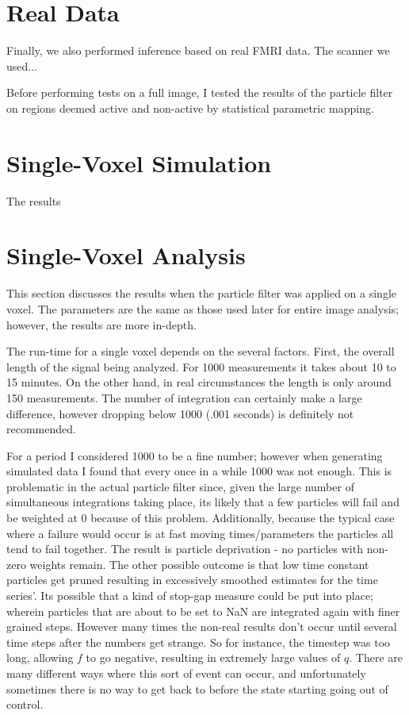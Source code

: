 \section{Real Data}
Finally, we also performed inference based on real FMRI data. The scanner we used...

Before performing tests on a full image, I tested the results of the particle filter
on regions deemed active and non-active by statistical parametric mapping. 
\section{Single-Voxel Simulation}
The results 

\section{Single-Voxel Analysis}
This section discusses the results when the particle filter was
applied on a single voxel. The parameters are the same as
those used later for entire image analysis; however, the results
are more in-depth. 

The run-time for a single voxel depends on the several factors. First, the
overall length of the signal being analyzed. For 1000 measurements it takes
about 10 to 15 minutes. On the other hand, in real circumstances the
length is only around 150 measurements. The number of  integration
can certainly make a large difference, however dropping below 1000 (.001 seconds)
is definitely not recommended. 

For a period I considered 1000 to be a
fine number; however when generating simulated data I found that every once
in a while 1000 was not enough. This is problematic in the actual particle
filter since, given the large number of simultaneous integrations taking 
place, its likely that a few particles will fail and be weighted at 0 because
of this problem. Additionally, because the typical case where a failure would
occur is at fast moving times/parameters the particles all tend to fail together.
The result is particle deprivation - no particles with non-zero weights remain.
The other possible outcome is that low time constant particles get pruned resulting
in excessively smoothed estimates for the time series'. Its possible that a
kind of stop-gap measure could be put into place; wherein particles that are
about to be set to NaN are integrated again with finer grained steps. However
many times the non-real results don't occur until several time steps after the 
numbers get strange. So for instance, the timestep was too long, allowing 
$f$ to go negative, resulting in extremely large values of $q$. There are many
different ways where this sort of event can occur, and unfortunately sometimes
there is no way to get back to before the state starting going out of control.

